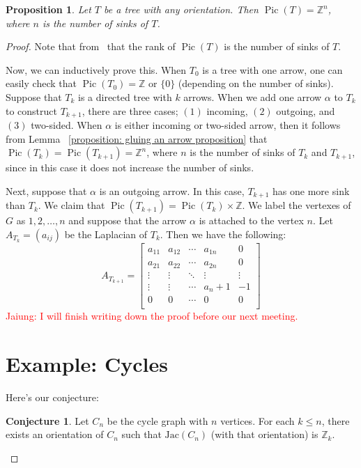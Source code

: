 \documentclass[11pt,reqno]{amsart}
\DeclareMathOperator{\Pic}{Pic}
\newcommand{\Jac}{\textrm{Jac}}{}
\theoremstyle{definition}
\newtheorem{conj}[mydef]{\textbf{Conjecture}}
\theoremstyle{plain}
\newtheorem{pro}[mydef]{\textbf{Proposition}}
\begin{document}
	\begin{pro}
		Let $T$ be a tree with any orientation. Then $\Pic(T)=\mathbb{Z}^n$, where $n$ is the number of sinks of $T$.
	\end{pro}
	\begin{proof}

		Note that from~\cite[Corollary 3.5]{wagner2000critical} that the rank of $\Pic(T)$ is the number of sinks of $T$.

		Now, we can inductively prove this. When $T_0$ is a tree with one arrow, one can easily check that
		$\Pic(T_0) =\mathbb{Z}$ or $\{0\}$ (depending on the number of sinks). Suppose that $T_k$ is a directed tree
		with $k$ arrows. When we add one arrow $\alpha$ to $T_k$ to construct $T_{k+1}$, there are three cases; $(1)$ incoming,
		$(2)$ outgoing, and $(3)$ two-sided. When $\alpha$ is either incoming or two-sided arrow, then it follows from Lemma
		~\ref{proposition: gluing an arrow proposition} that $\Pic(T_k)=\Pic(T_{k+1})=\mathbb{Z}^n$, where $n$ is the
		number of sinks of $T_k$ and $T_{k+1}$, since in this case it does not increase the number of sinks.

		Next, suppose that $\alpha$ is an outgoing arrow. In this case, $T_{k+1}$ has one more sink than $T_{k}$.
		We claim that $\Pic(T_{k+1})=\Pic(T_k)\times \mathbb{Z}$. We label the vertexes of $G$ as $1,2,\dots,n$ and
		suppose that the arrow $\alpha$ is attached to the vertex $n$. Let $A_{T_k}=(a_{ij})$ be the Laplacian of $T_k$.
		Then we have the following:
		\begin{equation}\label{eq: tree case}
			A_{T_{k+1}}=\left[\begin{array}{ccc|c|c}
				a_{11}&a_{12}&\cdots &a_{1n}&0\\
				a_{21}&a_{22}&\cdots &a_{2n}&0\\
				\vdots & \vdots &\ddots & \vdots & \vdots \\ \hline
				\vdots & \vdots & \cdots&a_n+1 & -1\\ \hline
				0&0&\cdots &0&0\\
			\end{array}\right]
		\end{equation}
		 \textcolor{red}{Jaiung: I will finish writing down the proof before our next meeting.}

		\section{Example: Cycles}

		Here's our conjecture:
		\begin{conj}
			Let $C_n$ be the cycle graph with $n$ vertices. For each $k \leq n$, there exists an orientation of $C_n$
			such that $\Jac(C_n)$ (with that orientation) is $\mathbb{Z}_k$.
		\end{conj}


\end{proof}
\end{document}
